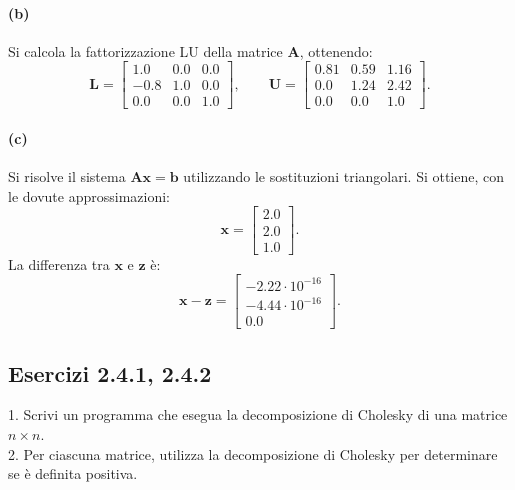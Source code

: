 \documentclass[letterpaper, 12pt]{article}
\begin{document}
\paragraph{(b) } Si calcola la fattorizzazione LU della matrice $\mathbf{A}$, ottenendo:
\begin{equation}
    \mathbf{L} = \begin{bmatrix}
        1.0  &     0.0  & 0.0 \\
        -0.8  &  1.0  & 0.0 \\
        0.0  &  0.0  &  1.0
    \end{bmatrix}, \qquad
    \mathbf{U} = \begin{bmatrix}
        0.81  &  0.59  &  1.16 \\
        0.0       &  1.24   &  2.42 \\
        0.0       &  0.0       &  1.0
    \end{bmatrix}.
\end{equation}
\paragraph{(c) } Si risolve il sistema $\mathbf{A}\mathbf{x} = \mathbf{b}$ utilizzando le sostituzioni triangolari.
Si ottiene, con le dovute approssimazioni:
\begin{equation}
    \mathbf{x} = \begin{bmatrix}
        2.0 \\ 
        2.0 \\ 
        1.0
    \end{bmatrix}.
\end{equation}
La differenza tra $\mathbf{x}$ e $\mathbf{z}$ è:
\begin{equation}
    \mathbf{x} - \mathbf{z} = \begin{bmatrix}
        -2.22 \cdot 10^{-16}  \\
        -4.44 \cdot 10^{-16}  \\
        0.0
    \end{bmatrix}.
\end{equation}

\subsection{Esercizi 2.4.1, 2.4.2}
1. Scrivi un programma che esegua la decomposizione di Cholesky di una matrice $n\times n$. \\
2. Per ciascuna matrice, utilizza la decomposizione di Cholesky per determinare se è definita positiva.
\end{document}
